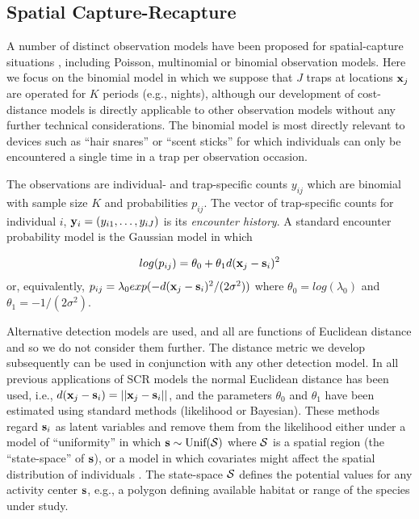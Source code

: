 \documentclass[12pt]{article}
\begin{document}
\begin{spacing}{1.8}
\section{Spatial Capture-Recapture}

A number of distinct observation models have been proposed for
spatial-capture situations \citep{borchers_efford:2008,
  royle_etal:2009ecol, efford_etal:2009ecol}, including Poisson,
multinomial or binomial observation models.
Here we focus on the binomial model in which we
suppose that $J$ traps at locations ${\bf x}_{j}$ are operated for $K$
periods (e.g., nights), although our development of cost-distance
models is directly applicable to other observation models without any
further technical considerations. The binomial model is most directly
relevant to devices such as ``hair snares''
\citep{woods_etal:1999,gardner_etal:2010jwm} or ``scent sticks''
\citep{kery_etal:2010} for which individuals can only be encountered a
single time in a trap per observation occasion.

The observations are individual- and trap-specific counts $y_{ij}$
which are binomial with sample size $K$ and probabilities
$p_{ij}$. The vector of trap-specific counts for individual $i$,
 ${\bf y}_{i} = (y_{i1},\ldots,y_{iJ})$ is its {\it encounter history}.
A standard encounter probability model
\citep{borchers_efford:2008} is the Gaussian model in which

\begin{equation}
log(p_{ij})= \theta_{0} + \theta_{1} d({\bf x}_{j} - {\bf s}_{i})^{2}
\label{eq.encounter}
\end{equation}
or, equivalently,
$p_{ij} = \lambda_{0} exp(-  d({\bf x}_{j} - {\bf s}_{i})^{2}
/(2\sigma^{2}) )$
where $\theta_{0} = log(\lambda_{0})$ and $\theta_{1} =
-1/(2\sigma^2)$.


Alternative detection models are used, and all are
functions of Euclidean distance and so we do not consider them
further. The distance metric we develop subsequently can be
used in conjunction with any other detection model.  In all previous
applications of SCR models the normal Euclidean distance has been
used, i.e., $ d({\bf x}_{j} - {\bf s}_{i}) = ||{\bf x}_{j} - {\bf
  s}_{i}||$, and the parameters $\theta_0$ and $\theta_1$ have been
estimated using standard methods (likelihood or Bayesian). These
methods regard ${\bf s}_{i}$ as latent variables
and remove them from the likelihood either under a
model of ``uniformity'' in which ${\bf s} \sim \mbox{Unif}({\cal
  S})$ where ${\cal S}$ is a spatial region (the ``state-space'' of
${\bf s}$), or a
model in which covariates might affect the spatial distribution of
individuals \citep{borchers_efford:2008}. The state-space ${\cal S}$
defines the potential values for any activity center ${\bf s}$, e.g.,
a polygon defining available habitat or range of the species under study.


\end{spacing}
\end{document}
